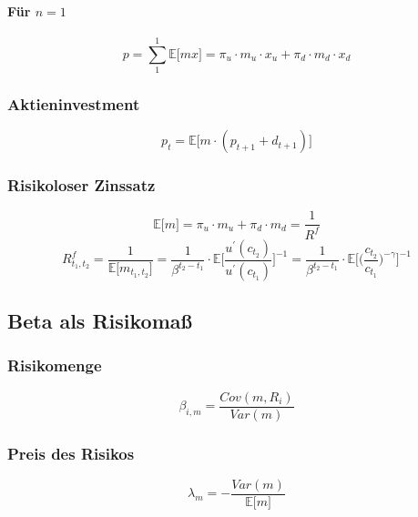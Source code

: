 \paragraph{Für \(n=1\)}
\begin{equation}
	p = \sum^1_1 \mathbb{E} \big\lbrack m x \big\rbrack = \pi_u \cdot m_u \cdot x_u + \pi_d \cdot m_d \cdot x_d
\end{equation}

\subsubsection{Aktieninvestment}
\begin{equation}
	p_t = \mathbb{E} \big\lbrack m \cdot (p_{t+1} + d_{t+1}) \big\rbrack \label{eq:paktie}
\end{equation}

\subsubsection{Risikoloser Zinssatz}
\begin{equation}
	\mathbb{E} \big\lbrack m \big\rbrack = \pi_u \cdot m_u + \pi_d \cdot m_d = \frac{1}{R^f} \label{eq:E}
\end{equation}
\begin{equation}
	R^f_{t_1, t_2} = \frac{1}{\mathbb{E} \big\lbrack m_{t_1,t_2} \big\rbrack} = \frac{1}{\beta^{t_2-t_1}} \cdot \mathbb{E} \Bigg\lbrack \frac{u^\prime(c_{t_2})}{u^\prime(c_{t_1})} \Bigg\rbrack^{-1} = \frac{1}{\beta^{t_2-t_1}} \cdot \mathbb{E} \Bigg\lbrack \bigg( \frac{c_{t_2}}{c_{t_1}} \bigg)^{-\gamma} \Bigg\rbrack^{-1} \label{eq:rf}
\end{equation}


\subsection{Beta als Risikomaß}

\subsubsection{Risikomenge}
\begin{equation}
	\beta_{i,m} = \frac{Cov(m,R_i)}{Var(m)}
\end{equation}

\subsubsection{Preis des Risikos}
\begin{equation}
	\lambda_m = - \frac{Var(m)}{\mathbb{E} \big\lbrack m \big\rbrack}
\end{equation}


